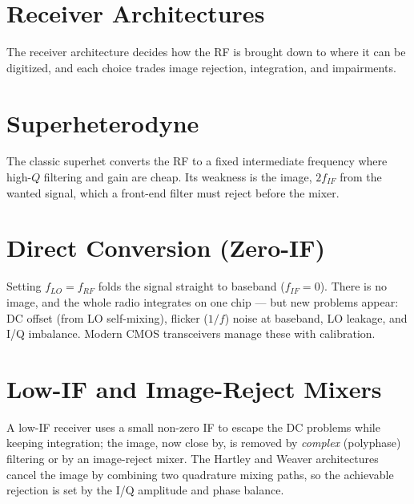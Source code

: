 \section{Receiver Architectures}\label{sec:tb_rxarch}



The receiver architecture decides how the RF is brought down to where it can be
digitized, and each choice trades image rejection, integration, and impairments.

\section{Superheterodyne}
The classic superhet converts the RF to a fixed intermediate frequency where
high-$Q$ filtering and gain are cheap. Its weakness is the image, $2f_{IF}$ from
the wanted signal, which a front-end filter must reject before the mixer.

\section{Direct Conversion (Zero-IF)}
Setting $f_{LO}=f_{RF}$ folds the signal straight to baseband ($f_{IF}=0$). There
is no image, and the whole radio integrates on one chip --- but new problems
appear: DC offset (from LO self-mixing), flicker ($1/f$) noise at baseband, LO
leakage, and I/Q imbalance. Modern CMOS transceivers manage these with
calibration.

\section{Low-IF and Image-Reject Mixers}
A low-IF receiver uses a small non-zero IF to escape the DC problems while
keeping integration; the image, now close by, is removed by \emph{complex}
(polyphase) filtering or by an image-reject mixer. The Hartley and Weaver
architectures cancel the image by combining two quadrature mixing paths, so the
achievable rejection is set by the I/Q amplitude and phase balance.




